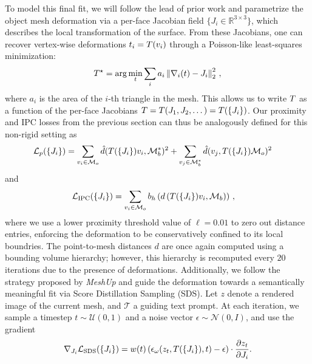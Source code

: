 To model this final fit, we will follow the lead of prior work \cite{aigerman2022neural, kim2025meshup, gao2023textdeformer, dinh2025geometry} and parametrize the object mesh deformation via a per-face Jacobian field \( \{J_i \in \mathbb{R}^{3 \times 3}\} \), which describes the local transformation of the surface. From these Jacobians, one can recover vertex-wise deformations $ t_i = T (v_i) $  through a Poisson-like least-squares minimization:
\begin{equation}\label{equ:poisson}
T^\star = \arg\min_t \sum_i a_i \left\| \nabla_i(t) - J_i \right\|_2^2\, ,
\end{equation}
where $a_i$ is the area of the $i$-th triangle in the mesh. This allows us to write $T$ as a function of the per-face Jacobians $T = T(J_1, J_2, \dots) = T(\{J_i\})$.
Our proximity and IPC losses from the previous section can thus be analogously defined for this non-rigid setting as
\begin{align}
\mathcal{L}_{p}(\{J_i\}) & = \sum_{v_{i} \in \mathcal{M}_o} \hat{d} (T(\{J_i\})v_i, \mathcal{M}_b^*)^2  
+  \sum_{v_{j} \in \mathcal{M}_b^*} \hat{d}(v_j, T(\{J_i\})\mathcal{M}_o)^2\,
\end{align}
and
\begin{align}
\mathcal{L}_{\text{IPC}}(\{J_i\}) & = \sum_{v_i \in \mathcal{M}_o} b_{h}\left(d\left(T(\{J_i\})v_i,\mathcal{M}_b\right)\right)\,,
\end{align}
where we use a lower proximity threshold value of $\ell=0.01$ to zero out distance entries, enforcing the deformation to be conservatively confined to its local boundries. 
The point-to-mesh distances $d$ are once again computed using a bounding volume hierarchy; however, this hierarchy is recomputed every $20$ iterations due to the presence of deformations.
Additionally, we follow the strategy proposed by \emph{MeshUp} \cite{kim2025meshup} and guide the deformation towards a semantically meaningful fit via Score Distillation Sampling (SDS).
Let \( z \) denote a rendered image of the current mesh, and \( \mathcal{T} \) a guiding text prompt. At each iteration, we sample a timestep \( t \sim \mathcal{U}(0,1) \) and a noise vector \( \epsilon \sim \mathcal{N}(0,I) \), and use the gradient
$$
\nabla_{J_i} \mathcal{L}_{\text{SDS}}(\{J_i\}) = w(t)\left(
\epsilon_\omega(z_t, T(\{J_i\}), t) - \epsilon
\right)
\cdot
\frac{\partial z_t}{\partial J_i}.
$$
